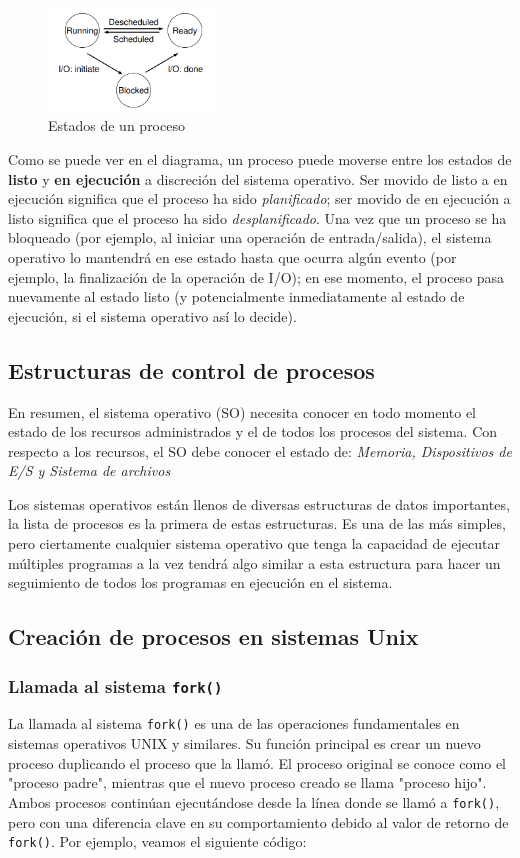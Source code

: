 \documentclass{article}
\begin{document}
\begin{figure}[h]
    \centering
    \includegraphics[width=0.4\textwidth]{src/states.png}
    \caption{Estados de un proceso}
\end{figure}

Como se puede ver en el diagrama, un proceso puede moverse entre los estados de \textbf{listo} y \textbf{en ejecución} a discreción del sistema operativo. Ser movido de listo a en ejecución significa que el proceso ha sido \textit{planificado}; ser movido de en ejecución a listo significa que el proceso ha sido \textit{desplanificado}. Una vez que un proceso se ha bloqueado (por ejemplo, al iniciar una operación de entrada/salida), el sistema operativo lo mantendrá en ese estado hasta que ocurra algún evento (por ejemplo, la finalización de la operación de I/O); en ese momento, el proceso pasa nuevamente al estado listo (y potencialmente inmediatamente al estado de ejecución, si el sistema operativo así lo decide).

\subsection{Estructuras de control de procesos}
En resumen, el sistema operativo (SO) necesita conocer en todo momento el estado de los recursos administrados y el de todos los procesos del sistema. Con respecto a los recursos, el SO debe conocer el estado de: \textit{Memoria, Dispositivos de E/S y Sistema de archivos}

Los sistemas operativos están llenos de diversas estructuras de datos importantes, la lista de procesos es la primera de estas estructuras. Es una de las más simples, pero ciertamente cualquier sistema operativo que tenga la capacidad de ejecutar múltiples programas a la vez tendrá algo similar a esta estructura para hacer un seguimiento de todos los programas en ejecución en el sistema.

\subsection{Creación de procesos en sistemas Unix}
\subsubsection{Llamada al sistema \texttt{fork()}}
La llamada al sistema \texttt{fork()} es una de las operaciones fundamentales en sistemas operativos UNIX y similares. Su función principal es crear un nuevo proceso duplicando el proceso que la llamó. El proceso original se conoce como el "proceso padre", mientras que el nuevo proceso creado se llama "proceso hijo". Ambos procesos continúan ejecutándose desde la línea donde se llamó a \texttt{fork()}, pero con una diferencia clave en su comportamiento debido al valor de retorno de \texttt{fork()}. Por ejemplo, veamos el siguiente código:
\end{document}
